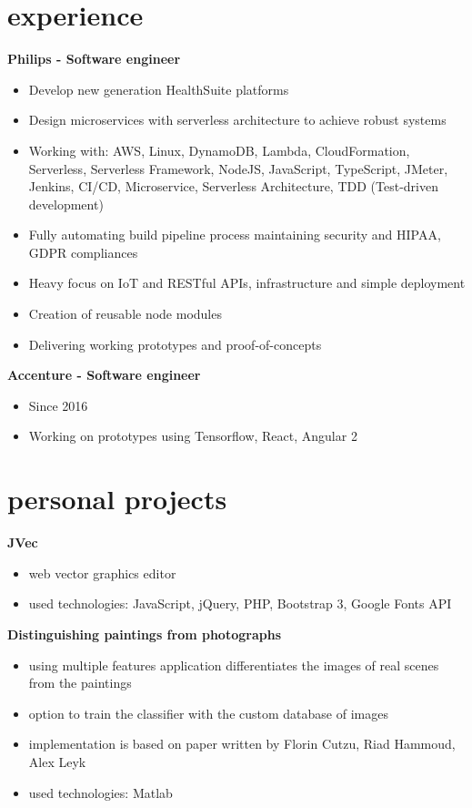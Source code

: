 \documentclass[]{friggeri-cv}
\begin{document}
\section{experience}

\textbf{Philips - Software engineer}
\begin{itemize}
  \item Develop new generation HealthSuite platforms
  \item Design microservices with serverless architecture to achieve robust systems
  \item Working with: AWS, Linux, DynamoDB, Lambda, CloudFormation, Serverless, Serverless Framework, NodeJS, JavaScript, TypeScript, JMeter, Jenkins, CI/CD, Microservice, Serverless Architecture, TDD (Test-driven development)
  \item Fully automating build pipeline process maintaining security and HIPAA, GDPR compliances
  \item Heavy focus on IoT and RESTful APIs, infrastructure and simple deployment
  \item Creation of reusable node modules
  \item Delivering working prototypes and proof-of-concepts
\end{itemize}

\textbf{Accenture - Software engineer}
\begin{itemize}
  \item Since 2016
  \item Working on prototypes using Tensorflow, React, Angular 2
\end{itemize}

\section{personal projects}

\textbf{JVec}
\begin{itemize}
  \item web vector graphics editor
  \item used technologies: JavaScript, jQuery, PHP, Bootstrap 3, Google Fonts API
\end{itemize}

\textbf{Distinguishing paintings from photographs}
\begin{itemize}
  \item using multiple features application differentiates the images of real scenes from the paintings
  \item option to train the classifier with the custom database of images
  \item implementation is based on paper written by Florin Cutzu, Riad Hammoud, Alex Leyk
  \item used technologies: Matlab
\end{itemize}
\end{document}

